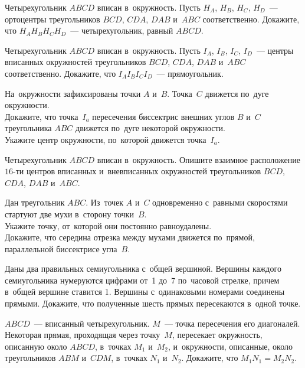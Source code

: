 


\begin{problems}

\item
Четырехугольник $ABCD$ вписан в~окружность.
Пусть $H_A$, $H_B$, $H_C$, $H_D$~--- ортоцентры треугольников
$BCD$, $CDA$, $DAB$ и~$ABC$ соответственно.
Докажите, что $H_A H_B H_C H_D$~--- четырехугольник, равный $ABCD$.

\item
Четырехугольник $ABCD$ вписан в~окружность.
Пусть $I_A$, $I_B$, $I_C$, $I_D$~--- центры вписанных окружностей
треугольников $BCD$, $CDA$, $DAB$ и~$ABC$ соответственно.
Докажите, что $I_A I_B I_C I_D$~--- прямоугольник.

\item
На~окружности зафиксированы точки $A$ и~$B$.
Точка~$C$ движется по~дуге окружности.
\\
\subproblem
Докажите, что точка~$I_a$ пересечения биссектрис внешних углов $B$ и~$C$
треугольника $ABC$ движется по~дуге некоторой окружности.
\\
\subproblem
Укажите центр окружности, по~которой движется точка~$I_a$.

\item
Четырехугольник $ABCD$ вписан в~окружность.
Опишите взаимное расположение $16$-ти центров вписанных и~вневписанных
окружностей треугольников $BCD$, $CDA$, $DAB$ и~$ABC$.

\item
Дан треугольник $ABC$.
Из~точек $A$ и~$C$ одновременно с~равными скоростями стартуют две мухи
в~сторону точки~$B$.
\\
\subproblem
Укажите точку, от~которой они постоянно равноудалены.
\\
\subproblem
Докажите, что середина отрезка между мухами движется по~прямой, параллельной
биссектрисе угла~$B$.

\item
Даны два правильных семиугольника с~общей вершиной.
Вершины каждого семиугольника нумеруются цифрами от~1 до~7 по~часовой
стрелке, причем в~общей вершине ставится 1.
Вершины с~одинаковыми номерами соединены прямыми.
Докажите, что полученные шесть прямых пересекаются в~одной точке.

\item
$ABCD$~--- вписанный четырехугольник.
$M$~--- точка пересечения его диагоналей.
Некоторая прямая, проходящая через точку~$M$, пересекает окружность, описанную
около $ABCD$, в~точках $M_1$ и~$M_2$, и~окружности, описанные, около
треугольников $ABM$ и~$CDM$, в~точках $N_1$ и~$N_2$.
Докажите, что $M_1 N_1 = M_2 N_2$.

\end{problems}

